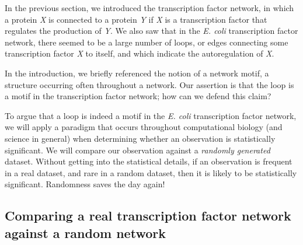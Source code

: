 In the previous section, we introduced the transcription factor network, in which a protein \textit{X} is connected to a protein \textit{Y} if \textit{X} is a transcription factor that regulates the production of \textit{Y}. We also saw that in the \textit{E. coli} transcription factor network, there seemed to be a large number of loops, or edges connecting some transcription factor \textit{X} to itself, and which indicate the autoregulation of \textit{X}.

In the introduction, we briefly referenced the notion of a network motif, a structure occurring often throughout a network. Our assertion is that the loop is a motif in the transcription factor network; how can we defend this claim?

To argue that a loop is indeed a motif in the \textit{E. coli} transcription factor network, we will apply a paradigm that occurs throughout computational biology (and science in general) when determining whether an observation is statistically significant. We will compare our observation against a  \textit{randomly generated} dataset. Without getting into the statistical details, if an observation is frequent in a real dataset, and rare in a random dataset, then it is likely to be statistically significant. Randomness saves the day again!

\begin{note}\end{note} 

 \begin{qbox}\end{qbox} 
 
\FloatBarrier
{}
\subsection{Comparing a real transcription factor network against a random network}

